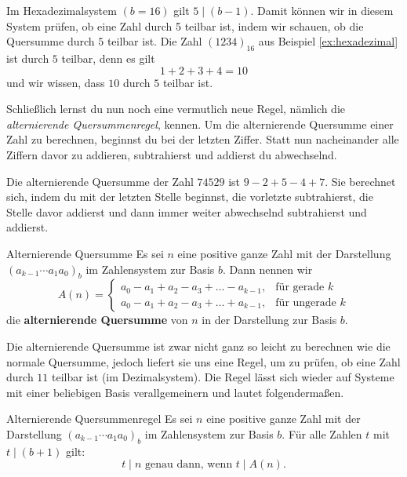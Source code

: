 \documentclass[../../main.tex]{subfiles}
\begin{document}
\begin{example}{}
    Im Hexadezimalsystem $(b=16)$ gilt $5\mid(b-1)$. Damit können wir in diesem System prüfen, ob eine Zahl durch 5 teilbar ist, indem wir schauen, ob die Quersumme durch $5$ teilbar ist. Die Zahl $(1234)_{16}$ aus Beispiel \ref{ex:hexadezimal} ist durch $5$ teilbar, denn es gilt
    \[1+2+3+4=10\]
    und wir wissen, dass $10$ durch $5$ teilbar ist.
\end{example}
Schließlich lernst du nun noch eine vermutlich neue Regel, nämlich die \emph{alternierende Quersummenregel}, kennen. Um die alternierende Quersumme einer Zahl zu berechnen, beginnst du bei der letzten Ziffer. Statt nun nacheinander alle Ziffern davor zu addieren, subtrahierst und addierst du abwechselnd.
\begin{example}{}
    Die alternierende Quersumme der Zahl $74529$ ist $9-2+5-4+7$. Sie berechnet sich, indem du mit der letzten Stelle beginnst, die vorletzte subtrahierst, die Stelle davor addierst und dann immer weiter abwechselnd subtrahierst und addierst.
\end{example}
\begin{definition}{Alternierende Quersumme}
    Es sei $n$ eine positive ganze Zahl mit der Darstellung $(a_{k-1}\cdots a_1a_0)_b$ im Zahlensystem zur Basis $b$. Dann nennen wir
    \[A(n)=\begin{cases}
        a_0-a_1+a_2-a_3+\dots-a_{k-1}, &\text{für gerade }k\\
        a_0-a_1+a_2-a_3+\dots+a_{k-1}, &\text{für ungerade }k
    \end{cases}\]
    die \textbf{alternierende Quersumme} von $n$ in der Darstellung zur Basis $b$.
\end{definition}
Die alternierende Quersumme ist zwar nicht ganz so leicht zu berechnen wie die normale Quersumme, jedoch liefert sie uns eine Regel, um zu prüfen, ob eine Zahl durch $11$ teilbar ist (im Dezimalsystem). Die Regel lässt sich wieder auf Systeme mit einer beliebigen Basis verallgemeinern und lautet folgendermaßen.
\begin{theorem}{Alternierende Quersummenregel}
    Es sei $n$ eine positive ganze Zahl mit der Darstellung $(a_{k-1}\cdots a_1a_0)_b$ im Zahlensystem zur Basis $b$. Für alle Zahlen $t$ mit $t\mid (b+1)$ gilt:
    \[t\mid n\text{ genau dann, wenn }t\mid A(n).\]
\end{theorem}
\end{document}
